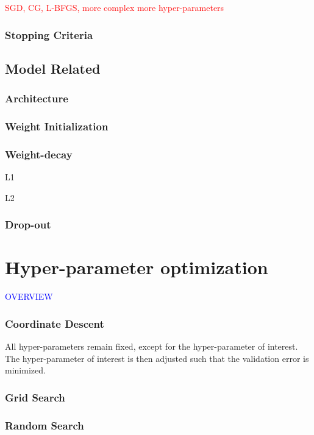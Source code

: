 \textcolor{red}{SGD, CG, L-BFGS, more complex more hyper-parameters}

\subsubsection{Stopping Criteria}

\subsection{Model Related}

\subsubsection{Architecture}

\subsubsection{Weight Initialization}

\subsubsection{Weight-decay}

L1

L2

\subsubsection{Drop-out}

\section{Hyper-parameter optimization}

\textcolor{blue}{OVERVIEW}

\subsubsection{Coordinate Descent}

All hyper-parameters remain fixed, except for the hyper-parameter of interest. The hyper-parameter of interest is then adjusted such that the validation error is minimized.

\subsubsection{Grid Search}

\subsubsection{Random Search}

